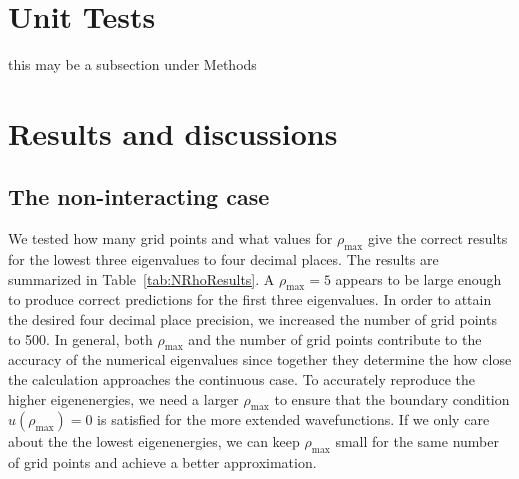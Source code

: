 \documentclass[10pt,showpacs,preprintnumbers,footinbib,amsmath,amssymb,aps,prl,twocolumn,groupedaddress,superscriptaddress,showkeys]{revtex4-1}
\newcommand{\rhomax}{
	\ensuremath{ \rho _{\mathrm{max}}} }
\begin{document}
{ 
\section{Unit Tests}
this may be a subsection under Methods


\section{Results and discussions}

\subsection{The non-interacting case}

We tested how many grid points and what values for \rhomax give
the correct results for the lowest three eigenvalues to four decimal places.
The results are summarized in Table~\ref{tab:NRhoResults}. A
$\rhomax = 5$ appears to be large enough to produce correct predictions
for the first three eigenvalues. In order to attain the desired four decimal
place precision, we increased the number of grid points to 500. In general,
both \rhomax and the number of grid points contribute to the accuracy of
the numerical eigenvalues since together they determine the how close
the calculation approaches the continuous case. To accurately reproduce
the higher
eigenenergies, we need a larger \rhomax to ensure that the boundary
condition $u(\rhomax)=0$ is satisfied for the more extended
wavefunctions. If we only care about the the
lowest eigenenergies, we can keep \rhomax small for the same number
of grid points and achieve a better approximation.

}
\end{document}
